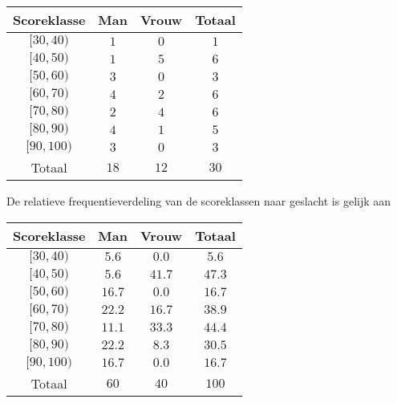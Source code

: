 \begin{enumerate}[label=(\alph*)]
{        \begin{center}
            \begin{tabular}{ccc|c}
                \toprule
                    {\bfseries Scoreklasse} & {\bfseries Man} & {\bfseries Vrouw} & {\bfseries Totaal} \\
                \midrule
                    $[30, 40)$ & $1$ & $0$ & $1$ \\
                    $[40, 50)$ & $1$ & $5$ & $6$ \\
                    $[50, 60)$ & $3$ & $0$ & $3$ \\
                    $[60, 70)$ & $4$ & $2$ & $6$ \\
                    $[70, 80)$ & $2$ & $4$ & $6$ \\
                    $[80, 90)$ & $4$ & $1$ & $5$ \\
                    $[90, 100)$ & $3$ & $0$ & $3$ \\
                \midrule    
                    Totaal & $18$ & $12$ & $30$ \\
                \bottomrule
            \end{tabular}
        \end{center}
        De relatieve frequentieverdeling van de scoreklassen naar geslacht is gelijk aan

        \begin{center}
            \begin{tabular}{ccc|c}
                \toprule
                    {\bfseries Scoreklasse} & {\bfseries Man} & {\bfseries Vrouw} & {\bfseries Totaal} \\
                \midrule
                    $[30, 40)$ & $5.6$ & $0.0$ & $5.6$ \\
                    $[40, 50)$ & $5.6$ & $41.7$ & $47.3$ \\
                    $[50, 60)$ & $16.7$ & $0.0$ & $16.7$ \\
                    $[60, 70)$ & $22.2$ & $16.7$ & $38.9$ \\
                    $[70, 80)$ & $11.1$ & $33.3$ & $44.4$ \\
                    $[80, 90)$ & $22.2$ & $8.3$ & $30.5$ \\
                    $[90, 100)$ & $16.7$ & $0.0$ & $16.7$ \\
                \midrule    
                    Totaal & $60$ & $40$ & $100$ \\
                \bottomrule
            \end{tabular}
        \end{center}
    }


\end{enumerate}
